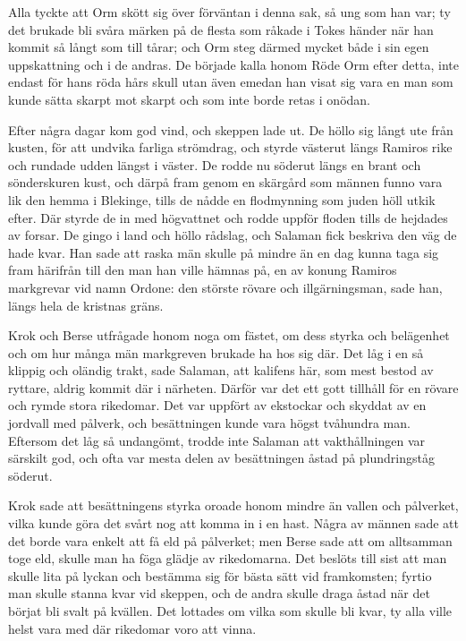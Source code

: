 \initial Alla tyckte att Orm skött sig över förväntan i denna sak, så ung som han var; ty det brukade bli svåra märken på de flesta som råkade i Tokes händer när han kommit så långt som till tårar; och Orm steg därmed mycket både i sin egen uppskattning och i de andras. De började kalla honom Röde Orm efter detta, inte endast för hans röda hårs skull utan även emedan han visat sig vara en man som kunde sätta skarpt mot skarpt och som inte borde retas i onödan.

\initial Efter några dagar kom god vind, och skeppen lade ut. De höllo sig långt ute från kusten, för att undvika farliga strömdrag, och styrde västerut längs Ramiros rike och rundade udden längst i väster. De rodde nu söderut längs en brant och sönderskuren kust, och därpå fram genom en skärgård som männen funno vara lik den hemma i Blekinge, tills de nådde en flodmynning som juden höll utkik efter. Där styrde de in med högvattnet och rodde uppför floden tills de hejdades av forsar. De gingo i land och höllo rådslag, och Salaman fick beskriva den väg de hade kvar. Han sade att raska män skulle på mindre än en dag kunna taga sig fram härifrån till den man han ville hämnas på, en av konung Ramiros markgrevar vid namn Ordone: den störste rövare och illgärningsman, sade han, längs hela de kristnas gräns.

\initial Krok och Berse utfrågade honom noga om fästet, om dess styrka och belägenhet och om hur många män markgreven brukade ha hos sig där. Det låg i en så klippig och oländig trakt, sade Salaman, att kalifens här, som mest bestod av ryttare, aldrig kommit där i närheten. Därför var det ett gott tillhåll för en rövare och rymde stora rikedomar. Det var uppfört av ekstockar och skyddat av en jordvall med pålverk, och besättningen kunde vara högst tvåhundra man. Eftersom det låg så undangömt, trodde inte Salaman att vakthållningen var särskilt god, och ofta var mesta delen av besättningen åstad på plundringståg söderut.

\initial Krok sade att besättningens styrka oroade honom mindre än vallen och pålverket, vilka kunde göra det svårt nog att komma in i en hast. Några av männen sade att det borde vara enkelt att få eld på pålverket; men Berse sade att om alltsamman toge eld, skulle man ha föga glädje av rikedomarna. Det beslöts till sist att man skulle lita på lyckan och bestämma sig för bästa sätt vid framkomsten; fyrtio man skulle stanna kvar vid skeppen, och de andra skulle draga åstad när det börjat bli svalt på kvällen. Det lottades om vilka som skulle bli kvar, ty alla ville helst vara med där rikedomar voro att vinna.

